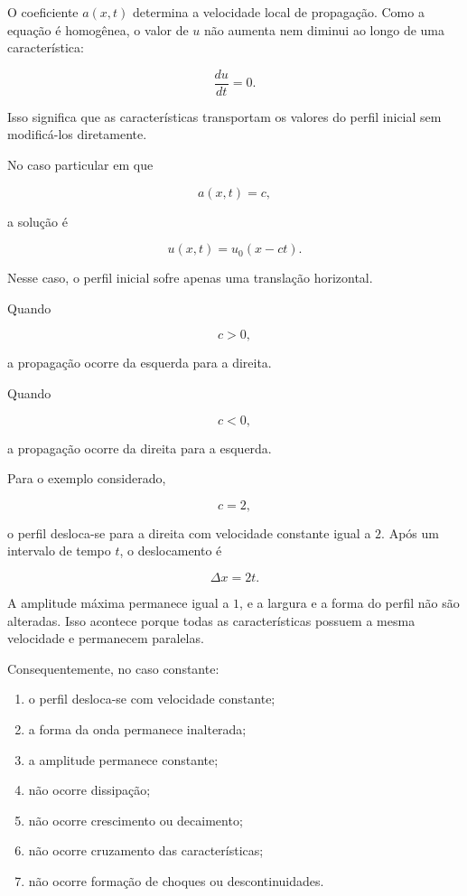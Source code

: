 \documentclass[
    12pt,
    oneside,
    a4paper,
    english,
    brazilian,
    chapter=TITLE,
    sumario=tradicional
]{abntex2}
\begin{document}
O coeficiente $a(x,t)$ determina a velocidade local de propagação. Como a
equação é homogênea, o valor de $u$ não aumenta nem diminui ao longo de uma
característica:

\[
    \frac{du}{dt}=0.
\]

Isso significa que as características transportam os valores do perfil
inicial sem modificá-los diretamente.

No caso particular em que

\[
    a(x,t)=c,
\]

a solução é

\[
    u(x,t)=u_0(x-ct).
\]

Nesse caso, o perfil inicial sofre apenas uma translação horizontal.

Quando

\[
    c>0,
\]

a propagação ocorre da esquerda para a direita.

Quando

\[
    c<0,
\]

a propagação ocorre da direita para a esquerda.

Para o exemplo considerado,

\[
    c=2,
\]

o perfil desloca-se para a direita com velocidade constante igual a $2$.
Após um intervalo de tempo $t$, o deslocamento é

\[
    \Delta x=2t.
\]

A amplitude máxima permanece igual a $1$, e a largura e a forma do perfil não
são alteradas. Isso acontece porque todas as características possuem a mesma
velocidade e permanecem paralelas.

Consequentemente, no caso constante:

\begin{enumerate}
    \item o perfil desloca-se com velocidade constante;
    \item a forma da onda permanece inalterada;
    \item a amplitude permanece constante;
    \item não ocorre dissipação;
    \item não ocorre crescimento ou decaimento;
    \item não ocorre cruzamento das características;
    \item não ocorre formação de choques ou descontinuidades.
\end{enumerate}
\end{document}
